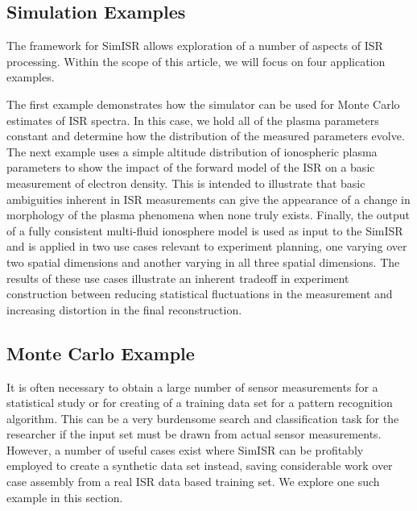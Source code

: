 \documentclass[draft,ras]{agutex}
\begin{document}
\begin{article}


\section{Simulation Examples}
The framework for SimISR allows exploration of a number of aspects of ISR processing. Within the scope of this article, we will focus on four application examples.

The first example demonstrates how the simulator can be used for Monte Carlo estimates of ISR spectra. In this case, we hold all of the plasma parameters constant and determine how the distribution of the measured parameters evolve. The next example uses a simple altitude distribution of ionospheric plasma parameters to show the impact of the forward model of the ISR on a basic measurement of electron density. This is intended to illustrate that basic ambiguities inherent in ISR measurements can give the appearance of a change in morphology of the plasma phenomena when none truly exists. Finally, the output of a fully consistent multi-fluid ionosphere model is used as input to the SimISR and is applied in two use cases relevant to experiment planning, one varying over two spatial dimensions and another varying in all three spatial dimensions. The results of these use cases illustrate an inherent tradeoff in experiment construction between reducing statistical fluctuations in the measurement and increasing distortion in the final reconstruction. 

\subsection{Monte Carlo Example}

It is often necessary to obtain a large number of sensor measurements for a statistical study or for creating of a training data set for a pattern recognition algorithm. This can be a very burdensome search and classification task for the researcher if the input set must be drawn from actual sensor measurements. However, a number of useful cases exist where SimISR can be profitably employed to create a synthetic data set instead, saving considerable work over case assembly from a real ISR data based training set.  We explore one such example in this section.


\end{article}
\end{document}
